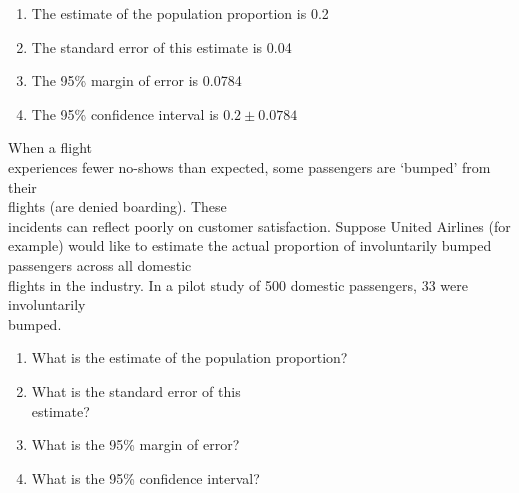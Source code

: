 \documentclass[11pt]{book}\usepackage[]{graphicx}\usepackage[]{color}
\begin{document}
\begin{exercises}
\begin{exercise}
  \end{exercise}
  \begin{solution} %

\begin{enumerate}
\item The estimate of the population proportion is 0.2
\item The standard error of this estimate is 0.04
\item The 95\% margin of error is 0.0784
\item The 95\% confidence interval is $0.2 \pm 0.0784$
\end{enumerate}

  \end{solution}

  \begin{exercise} %

When a flight \\ experiences fewer no-shows than expected, some passengers are `bumped' from their \\ flights (are denied boarding).  These \\ incidents can reflect poorly on customer satisfaction.  Suppose  United Airlines (for example) would like to estimate the actual proportion of involuntarily bumped passengers across all domestic \\ flights in the industry.  In a pilot study of 500 domestic passengers, 33 were involuntarily  \\ bumped.

\begin{enumerate}
\item	What is the estimate of the population proportion?
\item	What is the standard error of this \\ estimate?
\item	What is the 95\% margin of error?
\item	What is the 95\% confidence interval?
\end{enumerate}
  \end{exercise}
%


\end{exercises}
\end{document}
